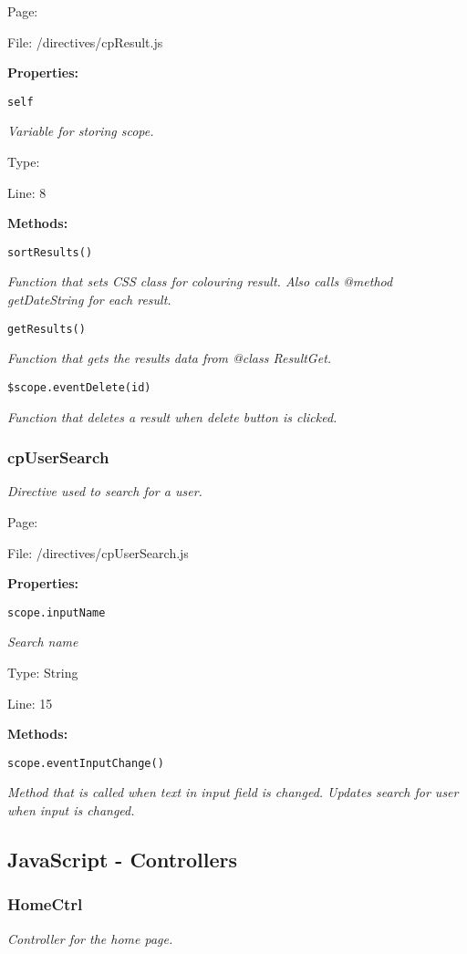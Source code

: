 Page: \pageref{cpResult.js}

File: /directives/cpResult.js

\textbf{Properties:}

\texttt{self}

{\scriptsize
\textit{Variable for storing scope.}

Type: 

Line: 8

}
\textbf{Methods:}

\texttt{sortResults()}

{\scriptsize
\textit{Function that sets CSS class for colouring result.
Also calls @method getDateString for each result.}

}

\texttt{getResults()}

{\scriptsize
\textit{Function that gets the results data from @class ResultGet.}

}

\texttt{\$scope.eventDelete(id)}

{\scriptsize
\textit{Function that deletes a result when delete button is clicked.}

}

\subsubsection{cpUserSearch}\label{cpUserSearch.js.doc}
\textit{Directive used to search for a user.}

Page: \pageref{cpUserSearch.js}

File: /directives/cpUserSearch.js

\textbf{Properties:}

\texttt{scope.inputName}

{\scriptsize
\textit{Search name}

Type: String

Line: 15

}
\textbf{Methods:}

\texttt{scope.eventInputChange()}

{\scriptsize
\textit{Method that is called when text in input field is changed.
Updates search for user when input is changed.}

}

\subsection{JavaScript - Controllers}
\subsubsection{HomeCtrl}\label{HomeCtrl.js.doc}
\textit{Controller for the home page.}

